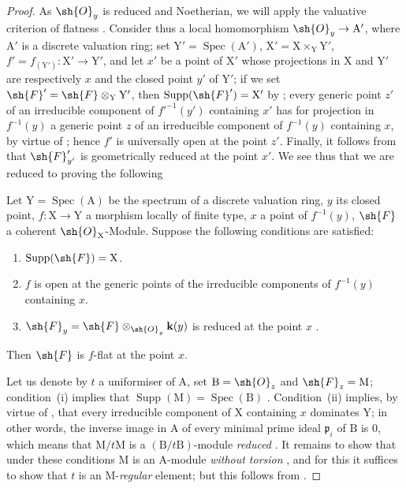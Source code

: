\begin{proof}
\label{IV.15.2.2-proof}
As $\sh{O}_y$ is reduced and Noetherian, we will apply the valuative criterion of flatness .
Consider thus a local homomorphism $\sh{O}_y\to\mathrm{A}'$, where $\mathrm{A}'$ is a discrete valuation ring; set $\mathrm{Y}'=\operatorname{Spec}(\mathrm{A}')$, $\mathrm{X}'=\mathrm{X}\times_\mathrm{Y}\mathrm{Y}'$, $f'=f_{(\mathrm{Y}')}:\mathrm{X}'\to\mathrm{Y}'$, and let $x'$ be a point of $\mathrm{X}'$ whose projections in $\mathrm{X}$ and $\mathrm{Y}'$ are respectively $x$ and the closed point $y'$ of $\mathrm{Y}'$; if we set $\sh{F}'=\sh{F}\otimes_\mathrm{Y}\mathrm{Y}'$, then $\operatorname{Supp}(\sh{F}')=\mathrm{X}'$ by ; every generic point $z'$ of an irreducible component of $f'^{-1}(y')$ containing $x'$ has for projection in $f^{-1}(y)$ a generic point $z$ of an irreducible component of $f^{-1}(y)$ containing $x$, by virtue of ; hence $f'$ is universally open at the point $z'$.
Finally, it follows from  that $\sh{F}_{y'}'$ is geometrically reduced at the point $x'$.
We see thus that we are reduced to proving the following

\begin{lemma}[15.2.2.1]
\label{IV.15.2.2.1}
Let $\mathrm{Y}=\operatorname{Spec}(\mathrm{A})$ be the spectrum of a discrete valuation ring, $y$ its closed point, $f:\mathrm{X}\to\mathrm{Y}$ a morphism locally of finite type, $x$ a point of $f^{-1}(y)$, $\sh{F}$ a coherent $\sh{O}_\mathrm{X}$-Module.
Suppose the following conditions are satisfied:
\begin{enumerate}[label=(\roman*)]
  \item $\operatorname{Supp}(\sh{F})=\mathrm{X}$.
  \item $f$ is open at the generic points of the irreducible components of $f^{-1}(y)$ containing $x$.
  \item $\sh{F}_y=\sh{F}\otimes_{\sh{O}_y}\mathbf{k}(y)$ is reduced at the point $x$ .
\end{enumerate}
Then $\sh{F}$ is $f$-flat at the point $x$.
\end{lemma}

Let us denote by $t$ a uniformiser of $\mathrm{A}$, set $\mathrm{B}=\sh{O}_z$ and $\sh{F}_z=\mathrm{M}$; condition~(i) implies that $\operatorname{Supp}(\mathrm{M})=\operatorname{Spec}(\mathrm{B})$ .
Condition~(ii) implies, by virtue of , that every irreducible component of $\mathrm{X}$ containing $x$ dominates $\mathrm{Y}$; in other words, the inverse image in $\mathrm{A}$ of every minimal prime ideal $\mathfrak{p}_i$ of $\mathrm{B}$ is $0$, which means that $\mathrm{M}/t\mathrm{M}$ is a $(\mathrm{B}/t\mathrm{B})$-module \emph{reduced} .
It remains to show that under these conditions $\mathrm{M}$ is an $\mathrm{A}$-module \emph{without torsion} , and for this it suffices to show that $t$ is an $\mathrm{M}$-\emph{regular} element; but this follows from .
\end{proof}

